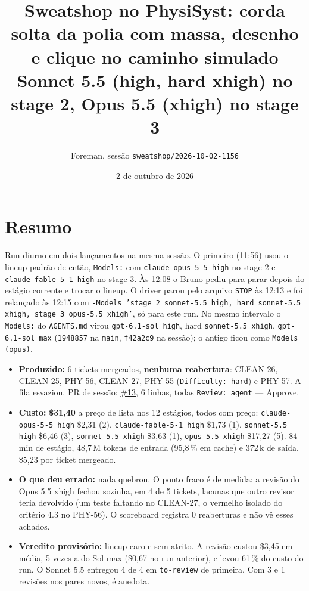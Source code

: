 \documentclass[11pt,a4paper]{article}
\title{Sweatshop no PhysiSyst: corda solta da polia com massa, desenho e clique no caminho simulado\\\large Sonnet 5.5 (high, hard xhigh) no stage 2, Opus 5.5 (xhigh) no stage 3}
\author{Foreman, sessão \texttt{sweatshop/2026-10-02-1156}}
\date{2 de outubro de 2026}
\begin{document}
\maketitle

\section*{Resumo}

Run diurno em dois lançamentos na mesma sessão. O primeiro (11:56) usou o
lineup padrão de então, \texttt{Models:} com \texttt{claude-opus-5-5 high} no
stage 2 e \texttt{claude-fable-5-1 high} no stage 3. Às 12:08 o Bruno pediu
para parar depois do estágio corrente e trocar o lineup. O driver parou pelo
arquivo \texttt{STOP} às 12:13 e foi relançado às 12:15 com
\texttt{-Models 'stage 2 sonnet-5.5 high, hard sonnet-5.5 xhigh, stage 3
opus-5.5 xhigh'}, só para este run. No mesmo intervalo o \texttt{Models:} do
\texttt{AGENTS.md} virou \texttt{gpt-6.1-sol high}, hard \texttt{sonnet-5.5
xhigh}, \texttt{gpt-6.1-sol max} (\texttt{1948857} na \texttt{main},
\texttt{f42a2c9} na sessão); o antigo ficou como \texttt{Models (opus)}.

\begin{itemize}
  \item \textbf{Produzido:} 6 tickets mergeados, \textbf{nenhuma reabertura}:
        CLEAN-26, CLEAN-25, PHY-56, CLEAN-27, PHY-55 (\texttt{Difficulty:
        hard}) e PHY-57. A fila esvaziou. PR de sessão:
        \href{https://github.com/Laginho/PhysiSyst/pull/13}{\#13}, 6 linhas,
        todas \texttt{Review: agent} --- Approve.
  \item \textbf{Custo:} \textbf{\$31,40} a preço de lista nos 12 estágios,
        todos com preço: \texttt{claude-opus-5-5 high} \$2,31 (2),
        \texttt{claude-fable-5-1 high} \$1,73 (1), \texttt{sonnet-5.5 high}
        \$6,46 (3), \texttt{sonnet-5.5 xhigh} \$3,63 (1), \texttt{opus-5.5
        xhigh} \$17,27 (5). 84 min de estágio, 48,7\,M tokens de entrada
        (95,8\,\% em cache) e 372\,k de saída. \$5,23 por ticket mergeado.
  \item \textbf{O que deu errado:} nada quebrou. O ponto fraco é de medida: a
        revisão do Opus 5.5 xhigh fechou sozinha, em 4 de 5 tickets, lacunas que
        outro revisor teria devolvido (um teste faltando no CLEAN-27, o
        vermelho isolado do critério 4.3 no PHY-56). O scoreboard registra 0
        reaberturas e não vê esses achados.
  \item \textbf{Veredito provisório:} lineup caro e sem atrito. A revisão
        custou \$3,45 em média, 5 vezes a do Sol max (\$0,67 no run anterior),
        e levou 61\,\% do custo do run. O Sonnet 5.5 entregou 4 de 4 em
        \texttt{to-review} de primeira. Com 3 e 1 revisões nos pares novos, é
        anedota.
\end{itemize}
\end{document}
